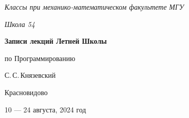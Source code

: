 \documentclass{article}
\begin{document}
\begin{titlepage}
    \centering
    \vspace*{\fill}
    
    {\sl\large Классы при механико-математическом факультете МГУ} \medskip

    {\sl\large Школа 54}

    \vspace*{4cm}

    \begin{spacing}{1}
        \LARGE\bfseries Записи лекций Летней Школы\par по Программированию
    \end{spacing}
    \smallskip
    
    {\Large С.\,С.\,Князевский}
    \vspace{.6cm}
    

    \vspace*{4cm}

    {\large Красновидово}\medskip
    
    {\large 10 --- 24 августа, 2024 год}
    \vspace*{\fill}
\end{titlepage}

\thispagestyle{empty}

\begin{abstract}
    Данные материалы являются конспектом лекций, прочитанных в Летней школе по программированию в 2024\,г. Сергеем Сергеевичем Князевским и студентами механико-математического факультета МГУ им. М.\,В.\,Ломоносова: Пшеничным Никитой, Клочковым Иваном и Хакамовым Рамилем. Представленные в данной брошюре темы были выбраны с целью подготовки к олимпиадам по программированию различного уровня, начиная со школьного и заканчивая всероссийским.

    Набор осуществлял Пшеничный Никита при участии Льва Целомудрова. За редактуру и вычитку спасибо Сергею Сергеевичу Князевскому.
\end{abstract}

\newpage

\tableofcontents
\newpage




















\newpage
\thispagestyle{empty}

\end{document}
